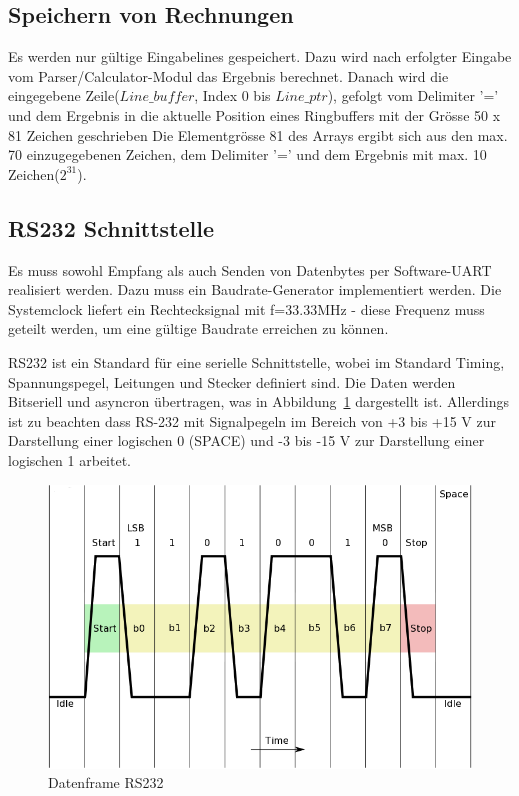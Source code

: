 \subsection{Speichern von Rechnungen}

Es werden nur gültige Eingabelines gespeichert. Dazu wird nach erfolgter Eingabe vom Parser/Calculator-Modul das Ergebnis berechnet. Danach wird die eingegebene Zeile($Line\_buffer$, Index 0 bis $Line\_ptr$), gefolgt vom Delimiter '=' und dem Ergebnis in die aktuelle Position eines Ringbuffers mit der Grösse 50 x 81 Zeichen geschrieben Die Elementgrösse 81 des Arrays ergibt sich aus den max. 70 einzugegebenen Zeichen, dem Delimiter '=' und dem Ergebnis mit max. 10 Zeichen($2^{31}$).

\subsection{RS232 Schnittstelle}

Es muss sowohl Empfang als auch Senden von Datenbytes per Software-UART realisiert werden. Dazu muss ein Baudrate-Generator implementiert werden. Die Systemclock liefert ein Rechtecksignal mit f=33.33MHz - diese Frequenz muss geteilt werden, um eine gültige Baudrate erreichen zu können.

RS232 ist ein Standard für eine serielle Schnittstelle, wobei im Standard Timing, Spannungspegel, Leitungen und Stecker definiert sind.
Die Daten werden Bitseriell und asyncron übertragen, was in Abbildung~\ref{fig:rs232frame} dargestellt ist. Allerdings ist zu beachten dass RS-232 mit Signalpegeln im Bereich von +3 bis +15 V zur Darstellung einer logischen 0 (SPACE) und -3 bis -15 V zur Darstellung einer logischen 1 arbeitet.
 
\begin{figure}[!ht]
	\centering
	\includegraphics[scale=0.5]{figures/rs232Trace.png} 
	\caption{Datenframe RS232}
	\label{fig:rs232frame}
\end{figure}


